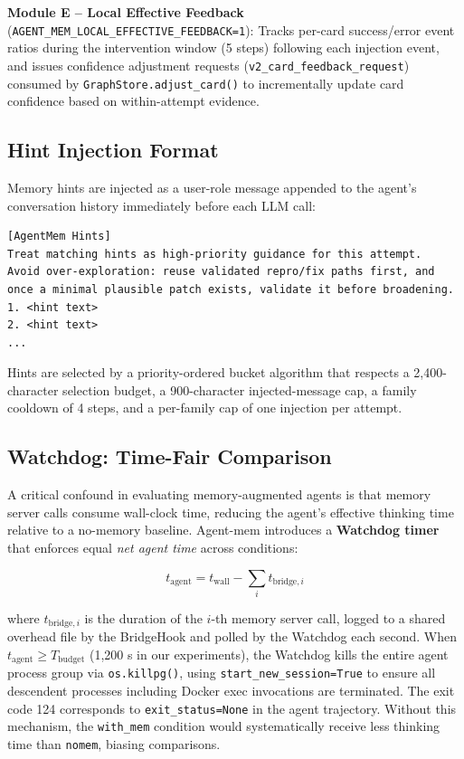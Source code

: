 \documentclass[runningheads]{llncs}
\begin{document}
\textbf{Module E -- Local Effective Feedback} (\texttt{AGENT\_MEM\_LOCAL\_EFFECTIVE\_FEEDBACK=1}): Tracks per-card success/error event ratios during the intervention window (5 steps) following each injection event, and issues confidence adjustment requests (\texttt{v2\_card\_feedback\_request}) consumed by \texttt{GraphStore.adjust\_card()} to incrementally update card confidence based on within-attempt evidence.

\subsection{Hint Injection Format}

Memory hints are injected as a user-role message appended to the agent's conversation history immediately before each LLM call:

\begin{verbatim}
[AgentMem Hints]
Treat matching hints as high-priority guidance for this attempt.
Avoid over-exploration: reuse validated repro/fix paths first, and
once a minimal plausible patch exists, validate it before broadening.
1. <hint text>
2. <hint text>
...
\end{verbatim}

Hints are selected by a priority-ordered bucket algorithm that respects a 2,400-character selection budget, a 900-character injected-message cap, a family cooldown of 4 steps, and a per-family cap of one injection per attempt.

\subsection{Watchdog: Time-Fair Comparison}

A critical confound in evaluating memory-augmented agents is that memory server calls consume wall-clock time, reducing the agent's effective thinking time relative to a no-memory baseline. Agent-mem introduces a \textbf{Watchdog timer} that enforces equal \emph{net agent time} across conditions:

\begin{equation}
t_{\text{agent}} = t_{\text{wall}} - \sum_i t_{\text{bridge},i}
\end{equation}

where $t_{\text{bridge},i}$ is the duration of the $i$-th memory server call, logged to a shared overhead file by the BridgeHook and polled by the Watchdog each second. When $t_{\text{agent}} \geq T_{\text{budget}}$ (1,200 s in our experiments), the Watchdog kills the entire agent process group via \texttt{os.killpg()}, using \texttt{start\_new\_session=True} to ensure all descendent processes including Docker exec invocations are terminated. The exit code 124 corresponds to \texttt{exit\_status=None} in the agent trajectory. Without this mechanism, the \texttt{with\_mem} condition would systematically receive less thinking time than \texttt{nomem}, biasing comparisons.
\end{document}
